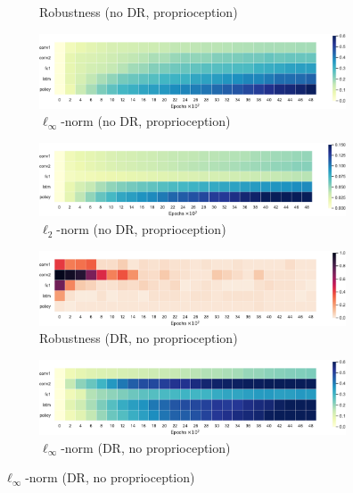 \begin{figure}[h!]
\begin{subfigure}{0.32\textwidth}
    \caption{Robustness (no DR, proprioception)}
  \end{subfigure}
  \begin{subfigure}{0.32\textwidth}
    \includegraphics[width=\textwidth]{figures/chapter6/robustness/fetch/sensor_std/inf_dist}
    \caption{$\ell_\infty$-norm (no DR, proprioception)}
  \end{subfigure}
  \begin{subfigure}{0.32\textwidth}
    \includegraphics[width=\textwidth]{figures/chapter6/robustness/fetch/sensor_std/l2_dist}
    \caption{$\ell_2$-norm (no DR, proprioception)}
  \end{subfigure}
  \begin{subfigure}{0.32\textwidth}
    \includegraphics[width=\textwidth]{figures/chapter6/robustness/fetch/visual_random/error}
    \caption{Robustness (DR, no proprioception)}
  \end{subfigure}
  \begin{subfigure}{0.32\textwidth}
    \includegraphics[width=\textwidth]{figures/chapter6/robustness/fetch/visual_random/inf_dist}
    \caption{$\ell_\infty$-norm (DR, no proprioception)}

\end{subfigure}
\end{figure}

